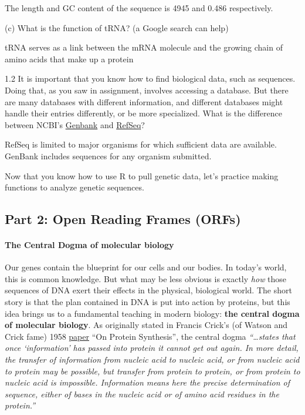 \documentclass[
]{article}
\begin{document}
{ The length and GC content of the sequence is 4945 and 0.486
respectively. }

(c) What is the function of tRNA? (a Google search can help) \span

{ tRNA serves as a link between the mRNA molecule and the growing chain
of amino acids that make up a protein }

1.2 It is important that you know how to find biological data, such as
sequences. Doing that, as you saw in assignment, involves accessing a
database. But there are many databases with different information, and
different databases might handle their entries differently, or be more
specialized. What is the difference between NCBI's
\href{https://www.ncbi.nlm.nih.gov/genbank/}{Genbank} and
\href{https://www.ncbi.nlm.nih.gov/refseq/}{RefSeq}? \span 

{ RefSeq is limited to major organisms for which sufficient data are
available. GenBank includes sequences for any organism submitted. }

Now that you know how to use R to pull genetic data, let's practice
making functions to analyze genetic sequences.

\hypertarget{part-2-open-reading-frames-orfs}{%
\subsection{Part 2: Open Reading Frames
(ORFs)}\label{part-2-open-reading-frames-orfs}}

\hypertarget{the-central-dogma-of-molecular-biology}{%
\paragraph{The Central Dogma of molecular
biology}\label{the-central-dogma-of-molecular-biology}}

Our genes contain the blueprint for our cells and our bodies. In today's
world, this is common knowledge. But what may be less obvious is exactly
\emph{how} those sequences of DNA exert their effects in the physical,
biological world. The short story is that the plan contained in DNA is
put into action by proteins, but this idea brings us to a fundamental
teaching in modern biology: \textbf{the central dogma of molecular
biology}. As originally stated in Francis Crick's (of Watson and Crick
fame) 1958
\href{https://profiles.nlm.nih.gov/spotlight/sc/feature/doublehelix}{paper}
``On Protein Synthesis'', the central dogma \emph{``\ldots states that
once `information' has passed into protein it cannot get out again. In
more detail, the transfer of information from nucleic acid to nucleic
acid, or from nucleic acid to protein may be possible, but transfer from
protein to protein, or from protein to nucleic acid is impossible.
Information means here the precise determination of sequence, either of
bases in the nucleic acid or of amino acid residues in the protein.''}
\end{document}
